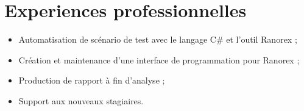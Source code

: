 \section{Experiences professionnelles}
%
            {}%
{%
\begin{itemize}%
\item Automatisation de scénario de test avec le langage C\# et l'outil Ranorex ;
\item Création et maintenance d’une interface de programmation pour Ranorex ;
\item Production de rapport à fin d'analyse ;
\item Support aux nouveaux stagiaires.
\end{itemize}}

